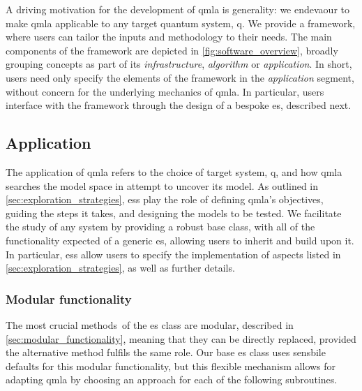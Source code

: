 A driving motivation for the development of \gls{qmla} is generality:
    we endevaour to make \gls{qmla} applicable to any target quantum system, \gls{q}.
We provide a framework, where users can tailor the inputs and methodology to their needs.
The main components of the framework are depicted in \cref{fig:software_overview}, 
    broadly grouping concepts as part of its \emph{infrastructure}, \emph{algorithm}
    or \emph{application}. 
In short, users need only specify the elements of the framework in the \emph{application} segment, 
    without concern for the underlying mechanics of \gls{qmla}.
In particular, users interface with the framework through the design of a bespoke \gls{es}, described next. 

\subsection{Application}\label{sec:application}
The application of \gls{qmla} refers to the choice of target system, \gls{q}, and how \gls{qmla} searches the 
     \gls{model space}  in attempt to uncover its model. 
As outlined in \cref{sec:exploration_strategies}, \glspl{es} play the role of 
    defining \gls{qmla}'s objectives, guiding the steps it takes, and designing the models to be tested. 
We facilitate the study of any system by providing a robust  base class,
    with all of the functionality expected of a generic \gls{es}, allowing users to inherit and build upon it. 
In particular, \glspl{es} allow users to specify the implementation of aspects listed in \cref{sec:exploration_strategies}, 
    as well as further details.
\par 


\subsubsection{Modular functionality}\label{sec:modular_functionality_sw}
The most crucial methods\footnotemark \ of the \gls{es} class are modular, 
    described in \cref{sec:modular_functionality},
    meaning that they can be directly replaced, provided the alternative method fulfils the same role. 
Our base \gls{es} class uses sensbile defaults for this modular functionality, 
    but this flexible mechanism allows for adapting \gls{qmla} by choosing an approach for each 
    of the following subroutines. 

